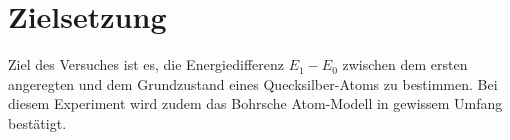 \section{Zielsetzung}
\label{sec:zielsetzung}
Ziel des Versuches ist es, die Energiedifferenz $E_1 - E_0$ zwischen dem ersten angeregten und dem Grundzustand eines 
Quecksilber-Atoms zu bestimmen. Bei diesem Experiment wird zudem das Bohrsche Atom-Modell in gewissem Umfang bestätigt.
